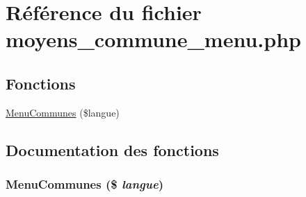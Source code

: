\hypertarget{moyens__commune__menu_8php}{
\section{R\'{e}f\'{e}rence du fichier moyens\_\-commune\_\-menu.php}
\label{moyens__commune__menu_8php}
}
\subsection*{Fonctions}
\begin{CompactItemize}
\item 
\hyperlink{moyens__commune__menu_8php_a0}{Menu\-Communes} (\$langue)
\end{CompactItemize}


\subsection{Documentation des fonctions}
\hypertarget{moyens__commune__menu_8php_a0}{
\subsubsection[MenuCommunes]{\setlength{\rightskip}{0pt plus 5cm}Menu\-Communes (\$ {\em langue})}}
\label{moyens__commune__menu_8php_a0}


